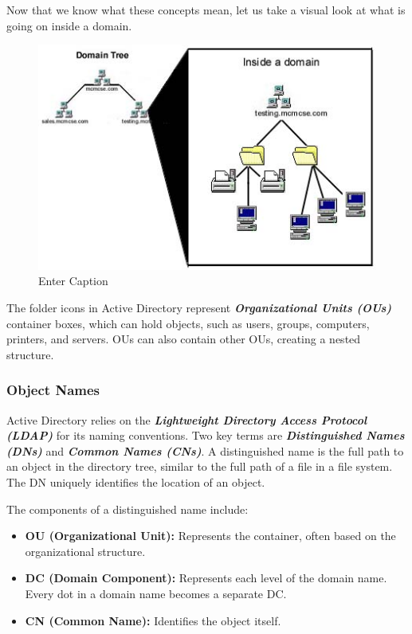 Now that we know what these concepts mean, let us take a visual look at what is going on inside a domain.
\begin{figure}
    \centering
    \includegraphics[width=0.75\linewidth]{ad4.png}
    \caption{Enter Caption}
    \label{fig:placeholder}
\end{figure}

The folder icons in Active Directory represent \textbf{\textit{Organizational Units (OUs)}} container boxes, which can hold objects, such as users, groups, computers, printers, and servers. OUs can also contain other OUs, creating a nested structure.

\subsubsection{Object Names}

Active Directory relies on the \textbf{\textit{Lightweight Directory Access Protocol (LDAP)}} for its naming conventions. Two key terms are \textbf{\textit{Distinguished Names (DNs)}} and \textbf{\textit{Common Names (CNs)}}. A distinguished name is the full path to an object in the directory tree, similar to the full path of a file in a file system. The DN uniquely identifies the location of an object.

The components of a distinguished name include:

\begin{itemize}
    \item \textbf{OU (Organizational Unit):} Represents the container, often based on the organizational structure.
    \item \textbf{DC (Domain Component):} Represents each level of the domain name. Every dot in a domain name becomes a separate DC.
    \item \textbf{CN (Common Name):} Identifies the object itself.
\end{itemize}


